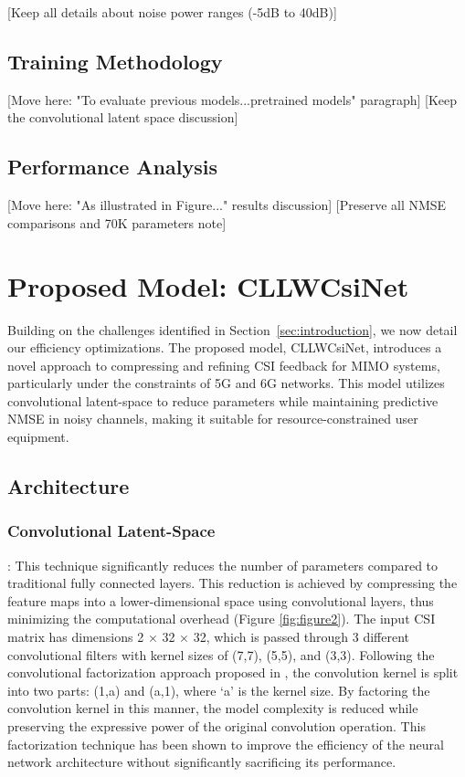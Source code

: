 \documentclass[lettersize,journal]{IEEEtran}
\begin{document}
[Keep all details about noise power ranges (-5dB to 40dB)]

\subsection{Training Methodology}
[Move here: "To evaluate previous models...pretrained models" paragraph]
[Keep the convolutional latent space discussion]

\subsection{Performance Analysis}
[Move here: "As illustrated in Figure..." results discussion]
[Preserve all NMSE comparisons and 70K parameters note]


\section{Proposed Model: CLLWCsiNet}
\label{sec:proposed_model}
Building on the challenges identified in Section~\ref{sec:introduction}, we now detail our efficiency optimizations.
The proposed model, CLLWCsiNet, introduces a novel approach to compressing and refining CSI feedback for MIMO systems, particularly under the constraints of 5G and 6G networks. This model utilizes convolutional latent-space to reduce parameters while maintaining predictive NMSE in noisy channels, making it suitable for resource-constrained user equipment.

\subsection{Architecture}
\subsubsection{Convolutional Latent-Space}:
This technique significantly reduces the number of parameters compared to traditional fully connected layers. This reduction is achieved by compressing the feature maps into a lower-dimensional space using convolutional layers, thus minimizing the computational overhead (Figure \ref{fig:figure2}). 
The input CSI matrix has dimensions 2 \begin{math} \times \end{math} 32 \begin{math} \times \end{math} 32, which is passed through 3 different convolutional filters with kernel sizes of (7,7), (5,5), and (3,3). Following the convolutional factorization approach proposed in \cite{abn}, the convolution kernel is split into two parts: (1,a) and (a,1), where ‘a’ is the kernel size. By factoring the convolution kernel in this manner, the model complexity is reduced while preserving the expressive power of the original convolution operation. This factorization technique has been shown to improve the efficiency of the neural network architecture without significantly sacrificing its performance.
\end{document}
